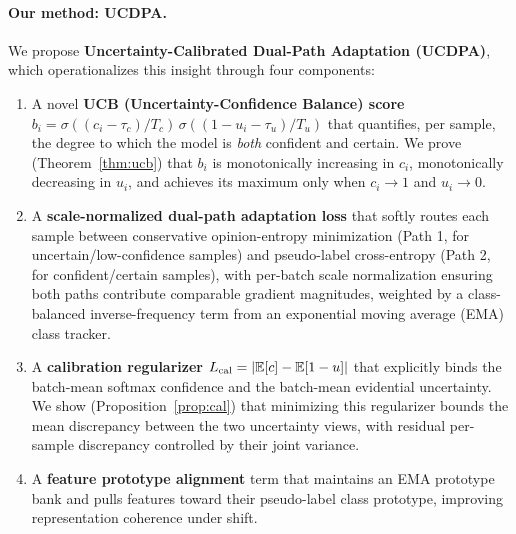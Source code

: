 \paragraph{Our method: UCDPA.}
We propose \textbf{Uncertainty-Calibrated Dual-Path Adaptation (UCDPA)}, which operationalizes this insight through four components:
\begin{enumerate}[leftmargin=*,topsep=2pt,itemsep=2pt]
  \item A novel \textbf{UCB (Uncertainty-Confidence Balance) score} $b_i = \sigma((c_i-\tau_c)/T_c)\,\sigma((1-u_i-\tau_u)/T_u)$ that quantifies, per sample, the degree to which the model is \emph{both} confident and certain. We prove (Theorem~\ref{thm:ucb}) that $b_i$ is monotonically increasing in $c_i$, monotonically decreasing in $u_i$, and achieves its maximum only when $c_i \to 1$ and $u_i \to 0$.
  \item A \textbf{scale-normalized dual-path adaptation loss} that softly routes each sample between conservative opinion-entropy minimization (Path 1, for uncertain/low-confidence samples) and pseudo-label cross-entropy (Path 2, for confident/certain samples), with per-batch scale normalization ensuring both paths contribute comparable gradient magnitudes, weighted by a class-balanced inverse-frequency term from an exponential moving average (EMA) class tracker.
  \item A \textbf{calibration regularizer} $L_\mathrm{cal} = |\mathbb{E}[c] - \mathbb{E}[1-u]|$ that explicitly binds the batch-mean softmax confidence and the batch-mean evidential uncertainty. We show (Proposition~\ref{prop:cal}) that minimizing this regularizer bounds the mean discrepancy between the two uncertainty views, with residual per-sample discrepancy controlled by their joint variance.
  \item A \textbf{feature prototype alignment} term that maintains an EMA prototype bank and pulls features toward their pseudo-label class prototype, improving representation coherence under shift.
\end{enumerate}

